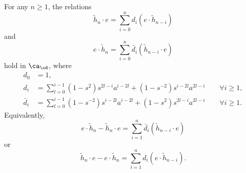 \begin{theorem} \label{prop:hncommutator}
For any $n \geq 1$, the relations
\begin{equation}
\tilde{h}_n \cdot e = \sum_{i=0}^n d_i (e \cdot \tilde{h}_{n-i})
\end{equation}
and
\begin{equation}
e \cdot \tilde{h}_n = \sum_{i=0}^n \bar{d}_i (\tilde{h}_{n-i} \cdot e)
\end{equation}
hold in $\ca_\cd$, where
\begin{align*}
d_0 & = 1, \\
d_i & = \sum_{l=0}^{i-1} (1 - s^2) s^{2l-i} a^{i-2l} + (1 - s^{-2}) s^{i-2l} a^{2l-i} \qquad \forall i \geq 1, \\
\bar{d}_i & = \sum_{l=0}^{i-1} (1 - s^{-2}) s^{i-2l} a^{i-2l} + (1 - s^{2}) s^{2l-i} a^{2l-i} \qquad \forall i \geq 1.
\end{align*}
Equivalently,
\begin{equation}
e \cdot \tilde{h}_n - \tilde{h}_n \cdot e = \sum_{i=1}^n \bar{d}_i (\tilde{h}_{n-i} \cdot e)
\end{equation}
or 
\begin{equation}
\tilde{h}_n \cdot e - e \cdot \tilde{h}_n = \sum_{i=1}^n d_i (e \cdot \tilde{h}_{n-i}).
\end{equation}
\end{theorem}
